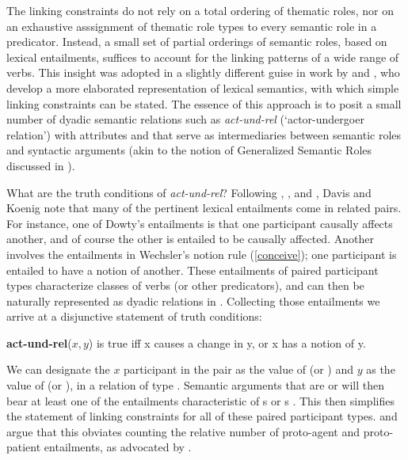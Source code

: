 \documentclass[output=paper]{langsci/langscibook}
\begin{document}
The linking constraints do not rely on a total ordering of thematic roles, nor on an exhaustive asssignment of thematic role types to every semantic role in a predicator. Instead, a small set of partial orderings of semantic roles, based on lexical entailments, suffices to account for the linking patterns of a wide range of verbs. 
This insight was adopted in a slightly different guise in work by \citet{Davis1996,Davis2001} and \cite{DavisandKoenig2000b}, who develop a more elaborated representation of lexical semantics, with which simple linking constraints can be stated.
The essence of this approach is to posit a small number of dyadic semantic relations such as \textit{act-und-rel} (`actor-undergoer relation') with attributes   and  that serve as intermediaries between semantic roles and syntactic arguments (akin to the notion of Generalized Semantic Roles discussed in \citealt{VanValin1999}).  

What are the truth conditions of \textit{act-und-rel}?  
Following \citet{Fillmore1977}, \citet{Dowty1991}, and \citet{Wechsler1995b}, Davis and Koenig note that many of the pertinent lexical entailments come in related pairs.
For instance, one of Dowty's entailments is that one participant causally affects another, and of course the other is entailed to be causally affected.
Another involves the entailments in Wechsler's notion rule (\ref{conceive}); one participant is entailed to have a notion of another. 
These entailments of paired participant types characterize classes of verbs (or other predicators), and can then be naturally represented as dyadic relations in .  Collecting those entailments we arrive at a disjunctive statement of truth conditions:

\begin{exe}
\ex \textbf{act-und-rel}($x,y$) is true iff x causes a change in y, or x has a notion of y.
\end{exe}

\noindent
We can designate the $x$ participant  in the pair as the value of  (or ) and $y$ as the value of  (or ), in a relation of type .   Semantic arguments that are  or  will then bear at least one of the entailments characteristic of s or s \citep[72]{DavisandKoenig2000b}. This then simplifies the statement of linking constraints for all of these paired participant types.
\citet{Davis1996} and \citet{KoenigandDavis2001} argue that this obviates counting the relative number of proto-agent and proto-patient entailments, as advocated by \citet{Dowty1991}.
\end{document}
